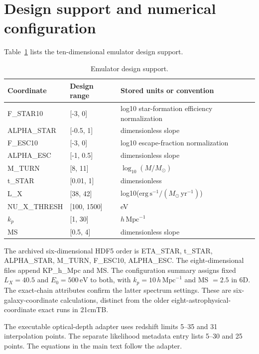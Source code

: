 \section{Design support and numerical configuration}\label{app:configuration}\label{parameter-domain-and-chain-definitions}

Table~\ref{tab:parameters} lists the ten-dimensional emulator design support.

\begin{table}[t]
\caption{Emulator design support.}
\label{tab:parameters}
\centering\small
\begin{tabular}{p{}p{}p{}}
\toprule
Coordinate & Design range & Stored units or convention \\
\midrule
F\_STAR10 & {[}-3, 0{]} & log10 star-formation efficiency normalization \\
ALPHA\_STAR & {[}-0.5, 1{]} & dimensionless slope \\
F\_ESC10 & {[}-3, 0{]} & log10 escape-fraction normalization \\
ALPHA\_ESC & {[}-1, 0.5{]} & dimensionless slope \\
M\_TURN & {[}8, 11{]} & $\log_{10}(M/M_\odot)$ \\
t\_STAR & {[}0.01, 1{]} & dimensionless \\
L\_X & {[}38, 42{]} & log10($\mathrm{erg\,s^{-1}}/(M_\odot\,\mathrm{yr^{-1}})$) \\
NU\_X\_THRESH & {[}100, 1500{]} & eV \\
\ensuremath{k_p} & {[}1, 30{]} & $h\,\mathrm{Mpc}^{-1}$ \\
MS & {[}0.5, 4{]} & dimensionless slope \\
\bottomrule
\end{tabular}
\end{table}

The archived six-dimensional HDF5 order is ETA\_STAR, t\_STAR, ALPHA\_STAR, M\_TURN, F\_ESC10, ALPHA\_ESC. The eight-dimensional files append KP\_h\_Mpc and MS. The configuration summary assigns fixed $L_X=40.5$ and $E_0=500\,\mathrm{eV}$ to both, with $k_p=10\,h\,\mathrm{Mpc}^{-1}$ and MS $=2.5$ in 6D. The exact-chain attributes confirm the latter spectrum settings. These are six-galaxy-coordinate calculations, distinct from the older eight-astrophysical-coordinate exact runs in 21cmTB.


The executable optical-depth adapter uses redshift limits 5--35 and 31 interpolation points. The separate likelihood metadata entry lists 5--30 and 25 points. The equations in the main text follow the adapter.

